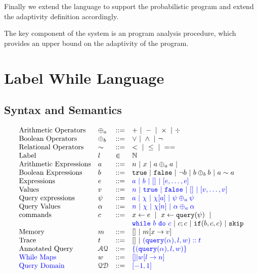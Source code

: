\documentclass[a4paper,11pt]{article}
\begin{document}
Finally we extend the language to support the probabilistic program and extend the adaptivity definition accordingly.


The key component of the system is an program analysis procedure, which provides an upper bound on the adaptivity of the program.

\section{Label While Language}
\label{sec:while_language}
%
\subsection{Syntax and Semantics}
%
\[
\begin{array}{llll}
 \mbox{Arithmetic Operators} & \oplus_a & ::= & + ~|~ - ~|~ \times 
%
~|~ \div \\  
  \mbox{Boolean Operators} & \oplus_b & ::= & \lor ~|~ \land ~|~ \neg\\
   \mbox{Relational Operators} & \sim & ::= & < ~|~ \leq ~|~ == \\  
   \mbox{Label} & l & \in &  \mathbb{N}  \\  
\mbox{Arithmetic Expressions} & \aexpr & ::= & 
	n ~|~ x ~|~ \aexpr \oplus_a \aexpr ~|~ \\
\mbox{Boolean Expressions} & \bexpr & ::= & 
	\etrue ~|~ \efalse  ~|~ \neg \bexpr
	 ~|~ \bexpr \oplus_b \bexpr
	~|~ \aexpr \sim \aexpr \\
\mbox{Expressions } & \expr & ::= & \jl{\aexpr \sep \bexpr ~|~ [] ~|~ [\expr, \dots, \expr]} \\
\mbox{Values } & v & ::= & \jl{ n \sep \etrue \sep \efalse ~|~ [] ~|~ [v, \dots, v]}  
\\
\mbox{Query expressions} & \qexpr & ::= 
& \jl{ \aexpr ~|~ \chi ~|~ \chi[\aexpr] ~|~ \qexpr \oplus_a \qexpr} 
\\
\mbox{Query Values} & \qval & ::= 
& \jl{ n ~|~ \chi ~|~ \chi[n] ~|~ \qval \oplus_a  \qval }
\\
\mbox{commands} & c & ::= &   \assign x \expr ~|~  \assign{x}{ \query(\qexpr)}
%
~|~ \\ 
&&&  \jl{\ewhile ~ b ~ \edo ~ c}  ~|~ c;c  ~|~ \eif(\bexpr, c, c) 	 ~|~ \eskip 
	\\
\mbox{Memory} & m & ::= & [] ~|~ m[x \to v] \\
\mbox{Trace} & t & ::= & [] 
~|~ \jl{{( \query(\qval), l, w) :: t}} \\
%
\mbox{Annotated Query} & \mathcal{AQ}  & 
::= & \jl{\{( \query(\qval), l, w) \} } 
\\
%
\mbox{\jl{While Maps}}
& w & ::= & \jl{[] |  w[l \to n]}
\\
%
\mbox{\jl{Query Domain}}
& \qdom & ::= & \jl{[-1,1]}
\end{array}
\]
%
%
\end{document}
